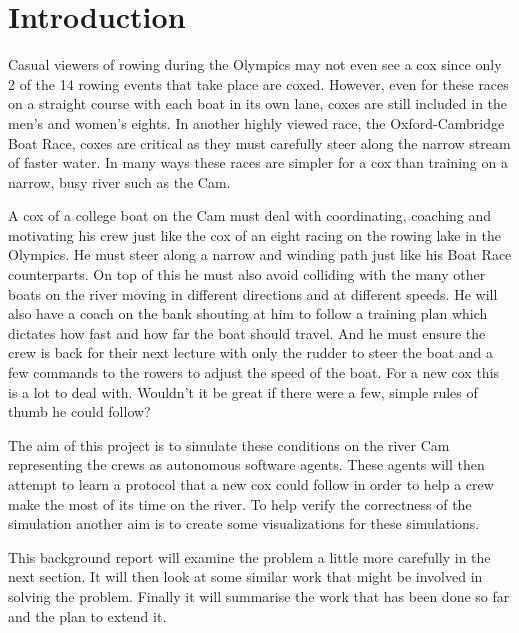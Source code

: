 \chapter{Introduction}
Casual viewers of rowing during the Olympics may not even see a cox
since only 2 of the 14 rowing events that take place are
coxed. 
However, even for these races on a straight course with each boat in its own lane,
coxes are still included in the men's and women's eights.
In another highly viewed race, the Oxford-Cambridge Boat Race, coxes
are critical as they must carefully steer along
the narrow stream of faster water. In many ways these races are simpler for a cox
than training on a narrow, busy river such as the Cam.

A cox of a college boat on the Cam must deal with coordinating,
coaching and motivating his crew just like the cox of an eight racing
on the rowing lake in the Olympics. He must steer along a narrow and
winding path just like his Boat Race counterparts. On top of this he
must also avoid colliding with the many other boats on the river
moving in different directions and at different speeds. He will also
have a coach on the bank shouting at him to follow a training plan
which dictates how fast and how far the boat should travel. And he
must ensure the crew is back for their next lecture with only the rudder to steer the boat and a few commands to the rowers to adjust the speed of the boat. For a new cox this is a lot to deal with. Wouldn't it be great if there were a few, simple rules of thumb he could follow?

The aim of this project is to simulate these conditions on the river Cam representing the crews as autonomous software agents. These agents will then attempt to learn a protocol that a new cox could follow in order to help a crew make the most of its time on the river. To help verify the correctness of the simulation another aim is to create some visualizations for these simulations.

This background report will examine the problem a little more
carefully in the next section. It will then look at some similar work
that might be involved in solving the problem. Finally it will summarise the work that has been done so far and the plan to extend it.
